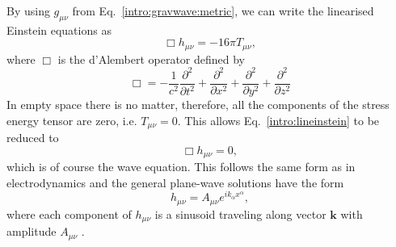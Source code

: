 By using $g_{\mu \nu}$ from Eq.~\ref{intro:gravwave:metric}, we can write the
linearised Einstein equations as
\begin{equation}
\label{intro:lineinstein}
    \Box h_{\mu \nu} = -16 \pi T_{\mu\nu},
\end{equation}
where $\Box$ is the d'Alembert operator defined by
\begin{equation}
		\Box = -\frac{1}{c^2} \frac{\partial^2}{\partial t^2} + \frac{\partial^2}{\partial x^2} + \frac{\partial^2}{\partial y^2} + \frac{\partial^2}{\partial z^2}
\end{equation}
In empty space there is no matter, therefore, all the components of the stress
energy tensor are zero, i.e. $T_{\mu \nu} = 0$.  This allows
Eq.~\ref{intro:lineinstein} to be reduced to
\begin{equation}
    \Box h_{\mu \nu} = 0,
\end{equation}
which is of course the wave equation.  This follows the same form as in
electrodynamics and the general plane-wave solutions have the form
\begin{equation}
    h_{\mu\nu} = A_{\mu\nu}e^{ik_{\alpha} x^{\alpha}},
\end{equation}
where each component of $h_{\mu \nu}$ is a sinusoid traveling along vector
$\mathbf{k}$ with amplitude $A_{\mu\nu}$
\citep{capano2011SearchingGravitational}. 


